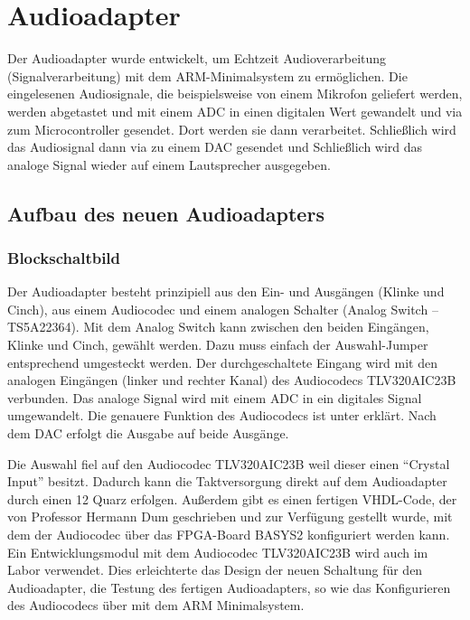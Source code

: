 \section[Audioadapter]{Audioadapter \cite{da:sps}}
\label{sec:audioadapter}

Der Audioadapter wurde entwickelt, um Echtzeit Audioverarbeitung (Signalverarbeitung) mit dem ARM-\gls{Minimalsystem} zu ermöglichen. Die eingelesenen Audiosignale, die beispielsweise von einem Mikrofon geliefert werden, werden abgetastet und mit einem \gls{ADC} in einen digitalen Wert gewandelt und via \IIS{} zum Microcontroller gesendet. Dort werden sie dann verarbeitet. Schließlich wird das Audiosignal dann via \IIS{} zu einem \gls{DAC} gesendet und Schließlich wird das analoge Signal wieder auf einem Lautsprecher ausgegeben.

\subsection{Aufbau des neuen Audioadapters}
\subsubsection{Blockschaltbild}
Der Audioadapter besteht prinzipiell aus den Ein- und Ausgängen (Klinke und Cinch), aus einem Audiocodec und einem analogen Schalter (Analog Switch – TS5A22364). Mit dem Analog Switch kann zwischen den beiden Eingängen, Klinke und Cinch, gewählt werden. Dazu muss einfach der Auswahl-Jumper entsprechend umgesteckt werden. Der durchgeschaltete Eingang wird mit den analogen Eingängen (linker und rechter Kanal) des Audiocodecs TLV320AIC23B verbunden. Das analoge Signal wird mit einem \gls{ADC} in ein digitales Signal umgewandelt. Die genauere Funktion des Audiocodecs ist unter  erklärt. Nach dem \gls{DAC} erfolgt die Ausgabe auf beide Ausgänge.

Die Auswahl fiel auf den Audiocodec TLV320AIC23B weil dieser einen \enquote{Crystal Input} besitzt. Dadurch kann die Taktversorgung direkt auf dem Audioadapter durch einen \unit{12}{\mega\hertz} Quarz erfolgen. Außerdem gibt es einen fertigen VHDL-Code, der von Professor Hermann Dum geschrieben und zur Verfügung gestellt wurde, mit dem der Audiocodec über das FPGA-Board BASYS2 konfiguriert werden kann. Ein Entwicklungsmodul mit dem Audiocodec TLV320AIC23B wird auch im Labor verwendet. Dies erleichterte das Design der neuen Schaltung für den Audioadapter, die Testung des fertigen Audioadapters, so wie das Konfigurieren des Audiocodecs über \IIC{} mit dem \gls{ARM} \gls{Minimalsystem}.

